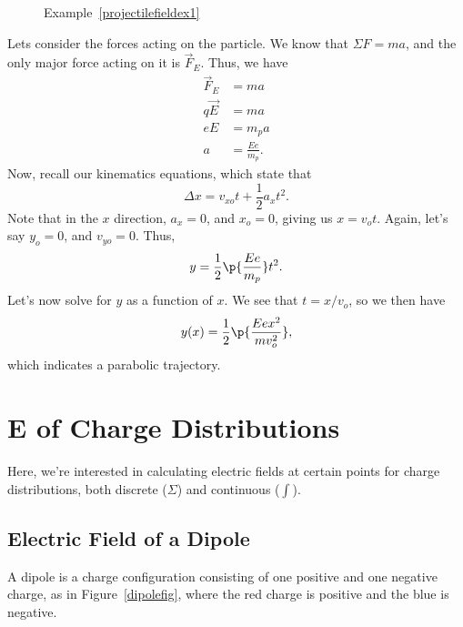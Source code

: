 \documentclass[11pt]{article}
\begin{document}
\begin{solution}
\begin{figure}[H]
		\caption{Example~\ref{projectilefieldex1}}
	\end{figure}
	
	\noindent Lets consider the forces acting on the particle. We know that $\Sigma F = ma$, and the only major force acting on it is $\vec{F}_E$. Thus, we have
	\begin{align*}
		\vec{F}_E &= ma \\
		q\vec{E} &= ma \\
		eE &= m_pa \\
		a &= \frac{Ee}{m_p}.	
	\end{align*}
	Now, recall our kinematics equations, which state that
	\[\Delta x = v_{xo}t + \frac{1}{2}a_xt^2.\]
	Note that in the $x$ direction, $a_x = 0$, and $x_o = 0$, giving us $x = v_ot.$ Again, let's say $y_o = 0$, and $v_{yo} = 0$. Thus,
	\[y = \frac{1}{2}\p{\frac{Ee}{m_p}}t^2.\]
	Let's now solve for $y$ as a function of $x$. We see that $t = x/v_o$, so we then have
	\[y(x) = \frac{1}{2}\p{\frac{Eex^2}{mv_o^2}},\]
	which indicates a parabolic trajectory.
\end{solution}

\section{\textbf{E} of Charge Distributions}
Here, we're interested in calculating electric fields at certain points for charge distributions, both discrete ($\Sigma$) and continuous ($\int$).

\subsection{Electric Field of a Dipole}
A dipole is a charge configuration consisting of one positive and one negative charge, as in Figure~\ref{dipolefig}, where the red charge is positive and the blue is negative.
\end{document}
